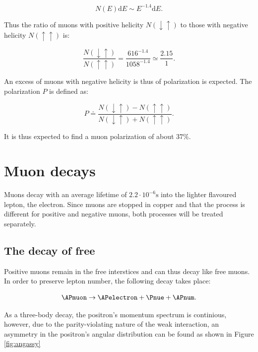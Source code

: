\begin{equation}
N(E) \mathrm{d}E \sim E^{-1.4}\mathrm{d} E.
\end{equation}

Thus the ratio of muons with positive helicity $N(\downarrow\uparrow)$ to those with negative helicity $N(\uparrow\uparrow)$ is:

\begin{equation}
\frac{N(\downarrow\uparrow)}{N(\uparrow\uparrow)}=\frac{616^{-1.4}}{1058^{-1.4}}\simeq \frac{2.15}{1}.
\end{equation}

An excess of muons with negative helicity is thus of polarization is expected. The polarization $P$ is defined as:

\begin{equation}
P\doteq \frac{N(\downarrow\uparrow)-N(\uparrow\uparrow)}{N(\downarrow\uparrow)+N(\uparrow\uparrow)}.
\end{equation}

It is thus expected to find a muon polarization of about $37\%$.

\section{Muon decays}

Muons decay with an average lifetime of $2.2 \cdot 10^{-6}\si{\second}$ into the lighter flavoured lepton, the electron. Since muons are stopped in copper and that the process is different for positive and negative muons, both processes will be treated separately.

\subsection{The decay of free \APmuon}

Positive muons remain in the free interstices and can thus decay like free muons. In order to preserve lepton number, the following decay takes place:

\begin{equation*}
\APmuon \rightarrow \APelectron + \Pnue + \APnum.
\end{equation*}

As a three-body decay, the positron's momentum spectrum is continious, however, due to the parity-violating nature of the weak interaction, an asymmetry in the positron's angular distribution can be found as shown in Figure \ref{fig:angassy}

